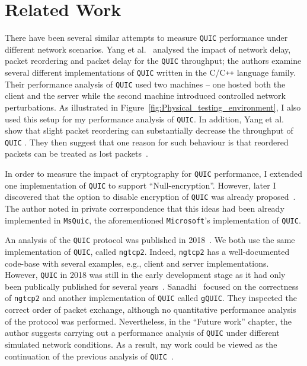 \documentclass[12pt,a4paper,twoside,openright]{report}
\begin{document}
\section{Related Work}
There have been several similar attempts to measure \texttt{QUIC} performance under different network scenarios. 
Yang et al.~\cite{Making_QUIC_Quicker} analysed the impact of network delay, packet reordering and packet delay for the \texttt{QUIC} throughput; the authors examine several different implementations of \texttt{QUIC} written in the C/C\texttt{++} language family.
Their performance analysis of \texttt{QUIC} used two machines -- one hosted both the client and the server while the second machine introduced controlled network perturbations.
As illustrated in Figure~\ref{fig:Physical_testing_environment}, I also used this setup for my performance analysis of \texttt{QUIC}.
In addition, Yang et al.~\cite{Making_QUIC_Quicker} show that slight packet reordering can substantially decrease the throughput of \texttt{QUIC} .
They then suggest that one reason for such behaviour is that reordered packets can be treated as lost packets~\cite{Making_QUIC_Quicker}. 


In order to measure the impact of cryptography for \texttt{QUIC} performance, I extended one implementation of \texttt{QUIC} to support \enquote{Null-encryption}.
However, later I discovered that the option to disable encryption of \texttt{QUIC} was already proposed~\cite{banks-quic-disable-encryption-00}.
The author noted in private correspondence that this ideas had been already implemented in \texttt{MsQuic}, the aforementioned \texttt{Microsoft}'s implementation of \texttt{QUIC}.



An analysis of the \texttt{QUIC} protocol was published in 2018~\cite{overview_of_the_QUIC_protocol}.
We both use the same implementation of \texttt{QUIC}, called \texttt{ngtcp2}.
Indeed, \texttt{ngtcp2} has a well-documented code-base with several examples, e.g., client and server implementations.   
However, \texttt{QUIC} in 2018 was still in the early development stage as it had only been publically published for several years~\cite{Chromium_Blog_Experimenting_with_quic}.
Sanadhi~\cite{overview_of_the_QUIC_protocol} focused on the correctness of \texttt{ngtcp2} and another implementation of \texttt{QUIC} called \texttt{gQUIC}.
They inspected the correct order of packet exchange, although no quantitative performance analysis of the protocol was performed.
Nevertheless, in the \enquote{Future work} chapter, the author suggests carrying out a performance analysis of \texttt{QUIC} under different simulated network conditions.
As a result, my work could be viewed as the continuation of the previous analysis of \texttt{QUIC}~\cite{overview_of_the_QUIC_protocol}.
\end{document}
